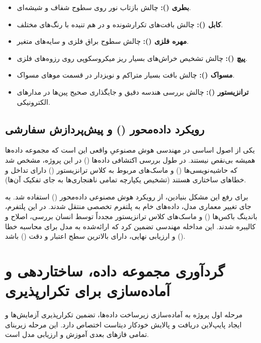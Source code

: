 \documentclass{article}
\begin{document}
\begin{itemize}
	\item \textbf{بطری ():} چالش بازتاب نور روی سطوح شفاف و شیشه‌ای.
	\item \textbf{کابل ():} چالش بافت‌های تکرارشونده و در هم تنیده با رنگ‌های مختلف.
	\item \textbf{مهره فلزی ():} چالش سطوح براق فلزی و سایه‌های متغیر.
	\item \textbf{پیچ ():} چالش تشخیص خراش‌های بسیار ریز میکروسکوپی روی رزوه‌های فلزی.
	\item \textbf{مسواک ():} چالش بافت بسیار متراکم و نویزدار در قسمت موهای مسواک.
	\item \textbf{ترانزیستور ():} چالش بررسی هندسه دقیق و جایگذاری صحیح پین‌ها در مدارهای الکترونیکی.
\end{itemize}

\subsection*{رویکرد داده‌محور () و پیش‌پردازش سفارشی}
یکی از اصول اساسی در مهندسی هوش مصنوعیِ واقعی این است که مجموعه داده‌ها همیشه بی‌نقص نیستند. در طول بررسی اکتشافی داده‌ها () در این پروژه، مشخص شد که حاشیه‌نویسی‌ها () و ماسک‌های مربوط به کلاس ترانزیستور () دارای تداخل و خطاهای ساختاری هستند (تشخیص یکپارچه تمامی ناهنجاری‌ها به جای تفکیک آن‌ها).

برای رفع این مشکل بنیادین، از رویکرد هوش مصنوعی داده‌محور () استفاده شد. به جای تغییر معماری مدل، داده‌های خام به پلتفرم تخصصی  منتقل شدند. در این پلتفرم، باندینگ باکس‌ها () و ماسک‌های کلاس ترانزیستور مجدداً توسط انسان بررسی، اصلاح و کالیبره شدند. این مداخله مهندسی تضمین کرد که  ارائه‌شده به مدل برای محاسبه خطا () و ارزیابی نهایی، دارای بالاترین سطح اعتبار و دقت () باشد.


\section{گردآوری مجموعه داده، ساختاردهی و آماده‌سازی برای تکرارپذیری}

مرحله اول پروژه به آماده‌سازی زیرساخت داده‌ها، تضمین تکرارپذیری آزمایش‌ها و ایجاد پایپ‌لاین دریافت و پالایش خودکار دیتاست اختصاص دارد. این مرحله زیربنای تمامی فازهای بعدی آموزش و ارزیابی مدل است.
\end{document}
